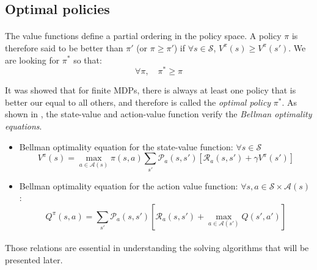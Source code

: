 \documentclass[a4paper]{report}
\begin{document}
{{			\subsection{Optimal policies}
			{
				\paragraph{} The value functions define a partial ordering in the policy space. A policy $\pi$ is therefore said to be better than $\pi'$ (or $\pi\geq \pi'$) if $\forall{s}\in\mathcal{S}$, $V^\pi(s) \geq V^\pi(s')$. We are looking for $\pi^*$ so that: 
				\begin{equation}
					\forall\pi, \quad \pi^* \geq \pi 
				\end{equation}
				
				It was showed that for finite MDPs, there is always at least one policy that is better our equal to all others, and therefore is called the \emph{optimal policy} $\pi^*$. As shown in \cite{Sutton98a}, the state-value and action-value function verify the \emph{Bellman optimality equations}. 
				
				\vspace{10pt}
				
				{
					\begin{itemize}[label=$\triangleright$]
						\item Bellman optimality equation for the state-value function: $\forall s \in\mathcal{S}$ 
						\begin{equation}
							V^\pi(s) = \max_{a\in\mathcal{A}(s)}\pi(s,a)\sum_{s'} \mathcal{P}_a(s,s')\left[\mathcal{R}_a(s,s') + \gamma V^\pi(s')\right]
						\end{equation}
						\item Bellman optimality equation for the action value function: $\forall{s,a}\in\mathcal{S}\times\mathcal{A}(s)$: 
						\begin{equation}
							Q^\pi(s,a) = \sum_{s'}\mathcal{P}_a(s,s')\left[ \mathcal{R}_a(s,s') + \max_{a\in\mathcal{A}(s')} Q(s',a') \right]
						\end{equation}
					\end{itemize}
				}
				
				\paragraph{} Those relations are essential in understanding the solving algorithms that will be presented later. 
			}
		}


}
\end{document}
